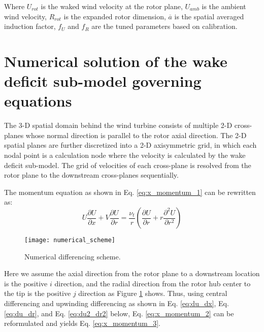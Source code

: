 \documentclass{umthesis}
\begin{document}
Where $U_{rot}$ is the waked wind velocity at the rotor plane, $U_{amb}$ is the ambient wind velocity, $R_{rot}$ is the expanded rotor dimension, $\overline{a}$ is the spatial averaged induction factor, $f_U$ and $f_R$ are the tuned parameters based on calibration.


\section{Numerical solution of the wake deficit sub-model governing equations} \label{sec:numerical solution}
The 3-D spatial domain behind the wind turbine consists of multiple 2-D cross-planes whose normal direction is parallel to the rotor axial direction. The 2-D spatial planes are further discretized into a 2-D axisymmetric grid, in which each nodal point is a calculation node where the velocity is calculated by the wake deficit sub-model. The grid of velocities of each cross-plane is resolved from the rotor plane to the downstream cross-planes sequentially.

The momentum equation as shown in Eq. \ref{eq:x_momentum_1} can be rewritten as:
\begin{equation}\label{eq:x_momentum_2}
  U\frac{\partial U}{\partial x}+V\frac{\partial U}{\partial r}=\frac{\nu_t}{r}(\frac{\partial U}{\partial r}+r\frac{\partial^2 U}{\partial r^2})
\end{equation}

\begin{figure}
  \centering
  \texttt{[image: numerical\_scheme]}
  \caption{Numerical differencing scheme.}\label{fig:numerical_scheme}
\end{figure}


Here we assume the axial direction from the rotor plane to a downstream location is the positive $i$ direction, and the radial direction from the rotor hub center to the tip is the positive $j$ direction as Figure \ref{fig:numerical_scheme} shows. Thus, using central differencing and upwinding differencing as shown in Eq. \ref{eq:du_dx}, Eq. \ref{eq:du_dr}, and Eq. \ref{eq:du2_dr2} below,
Eq. \ref{eq:x_momentum_2} can be reformulated and yields Eq. \ref{eq:x_momentum_3}.
\end{document}
